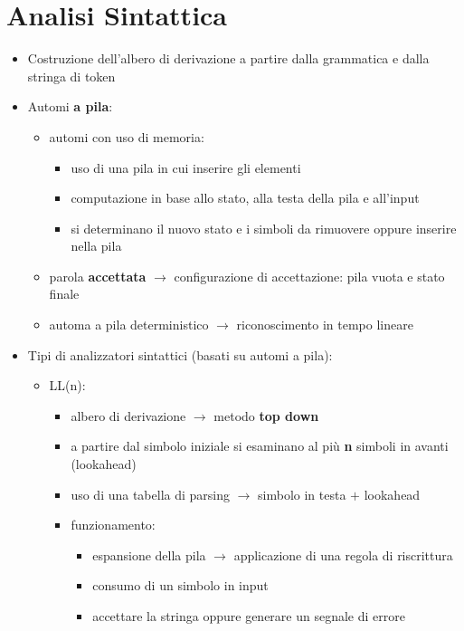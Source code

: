 \documentclass{article}
\begin{document}
\newpage

\section*{Analisi Sintattica}

\begin{itemize}
  \item Costruzione dell'albero di derivazione a partire dalla grammatica e dalla stringa di token
  \item Automi \textbf{a pila}:
  \begin{itemize}
    \item automi con uso di memoria:
    \begin{itemize}
      \item uso di una pila in cui inserire gli elementi
      \item computazione in base allo stato, alla testa della pila e all'input
      \item si determinano il nuovo stato e i simboli da rimuovere oppure inserire nella pila
    \end{itemize}
    \item parola \textbf{accettata} $\rightarrow$ configurazione di accettazione: pila vuota e stato finale
    \item automa a pila deterministico $\rightarrow$ riconoscimento in tempo lineare
  \end{itemize}
  \item Tipi di analizzatori sintattici (basati su automi a pila):
  \begin{itemize}
    \item LL(n):
    \begin{itemize}
      \item albero di derivazione $\rightarrow$ metodo \textbf{top down}
      \item a partire dal simbolo iniziale si esaminano al più \textbf{n} simboli in avanti (lookahead)
      \item uso di una tabella di parsing $\rightarrow$ simbolo in testa $+$ lookahead
      \item funzionamento:
      \begin{itemize}
        \item espansione della pila $\rightarrow$ applicazione di una regola di riscrittura
        \item consumo di un simbolo in input 
        \item accettare la stringa oppure generare un segnale di errore

\end{itemize}
\end{itemize}
\end{itemize}
\end{itemize}
\end{document}
